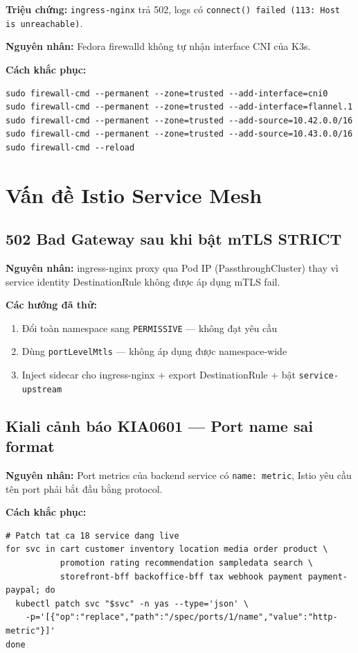 \textbf{Triệu chứng:} \texttt{ingress-nginx} trả 502, logs có
\texttt{connect() failed (113: Host is unreachable)}.

\textbf{Nguyên nhân:} Fedora firewalld không tự nhận interface CNI của K3s.

\textbf{Cách khắc phục:}
\begin{lstlisting}[style=bashstyle]
sudo firewall-cmd --permanent --zone=trusted --add-interface=cni0
sudo firewall-cmd --permanent --zone=trusted --add-interface=flannel.1
sudo firewall-cmd --permanent --zone=trusted --add-source=10.42.0.0/16
sudo firewall-cmd --permanent --zone=trusted --add-source=10.43.0.0/16
sudo firewall-cmd --reload
\end{lstlisting}

\section{Vấn đề Istio Service Mesh}

\subsection{502 Bad Gateway sau khi bật mTLS STRICT}

\textbf{Nguyên nhân:} ingress-nginx proxy qua Pod IP (PassthroughCluster) thay vì
service identity \textrightarrow{} DestinationRule không được áp dụng \textrightarrow{} mTLS fail.

\textbf{Các hướng đã thử:}
\begin{enumerate}
  \item [Không] Đổi toàn namespace sang \texttt{PERMISSIVE} --- không đạt yêu cầu
  \item [Không] Dùng \texttt{portLevelMtls} --- không áp dụng được namespace-wide
  \item [OK] Inject sidecar cho ingress-nginx + export DestinationRule + bật \texttt{service-upstream}
\end{enumerate}

\subsection{Kiali cảnh báo KIA0601 — Port name sai format}

\textbf{Nguyên nhân:} Port metrics của backend service có \texttt{name: metric},
Istio yêu cầu tên port phải bắt đầu bằng protocol.

\textbf{Cách khắc phục:}
\begin{lstlisting}[style=bashstyle]
# Patch tat ca 18 service dang live
for svc in cart customer inventory location media order product \
           promotion rating recommendation sampledata search \
           storefront-bff backoffice-bff tax webhook payment payment-paypal; do
  kubectl patch svc "$svc" -n yas --type='json' \
    -p='[{"op":"replace","path":"/spec/ports/1/name","value":"http-metric"}]'
done
\end{lstlisting}

